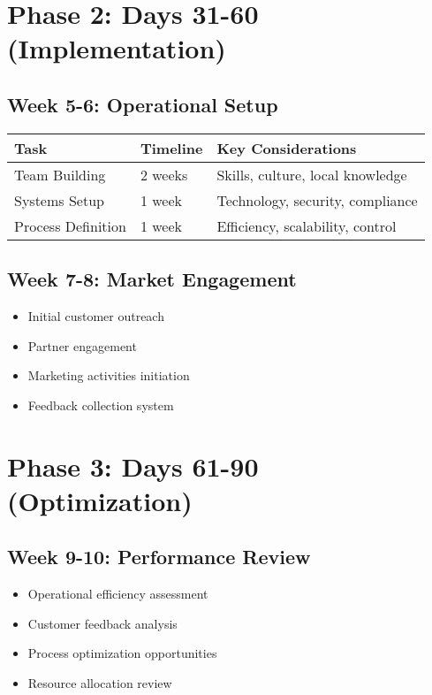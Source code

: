 \section{Phase 2: Days 31-60 (Implementation)}

\subsection{Week 5-6: Operational Setup}
\begin{center}
\begin{tabular}{p{}|p{}|p{}}
    \textbf{Task} & \textbf{Timeline} & \textbf{Key Considerations} \\
    \hline
    Team Building & 2 weeks & Skills, culture, local knowledge \\
    Systems Setup & 1 week & Technology, security, compliance \\
    Process Definition & 1 week & Efficiency, scalability, control \\
\end{tabular}
\end{center}

\subsection{Week 7-8: Market Engagement}
\begin{itemize}
    \item Initial customer outreach
    \item Partner engagement
    \item Marketing activities initiation
    \item Feedback collection system
\end{itemize}

\section{Phase 3: Days 61-90 (Optimization)}

\subsection{Week 9-10: Performance Review}
\begin{tcolorbox}[colback=white,colframe=primary,title=\textbf{Review Framework}]
\begin{itemize}
    \item Operational efficiency assessment
    \item Customer feedback analysis
    \item Process optimization opportunities
    \item Resource allocation review
\end{itemize}
\end{tcolorbox}

